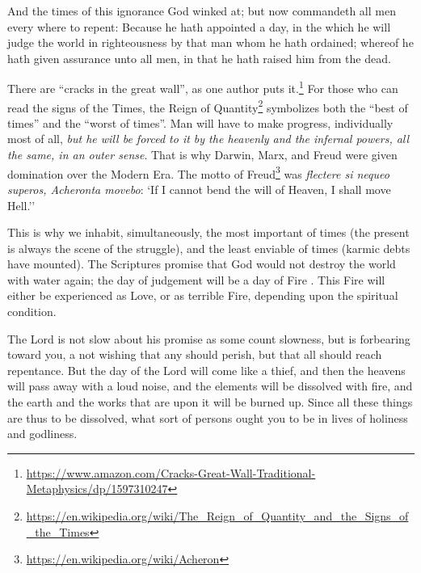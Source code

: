 \begin{quotex}
And the times of this ignorance God winked at; but now commandeth all men every where to repent: Because he hath appointed a day, in the which he will judge the world in righteousness by that man whom he hath ordained; whereof he hath given assurance unto all men, in that he hath raised him from the dead.
\end{quotex}


There are ``cracks in the great wall'', as one author puts it.\footnote{\url{https://www.amazon.com/Cracks-Great-Wall-Traditional-Metaphysics/dp/1597310247}} For those who can read the signs of the Times, the Reign of Quantity\footnote{\url{https://en.wikipedia.org/wiki/The\_Reign\_of\_Quantity\_and\_the\_Signs\_of\_the\_Times}} symbolizes both the ``best of times'' and the ``worst of times''. Man will have to make progress, individually most of all, \emph{but he will be forced to it by the heavenly and the infernal powers, all the same, in an outer sense}. That is why Darwin, Marx, and Freud were given domination over the Modern Era. The motto of Freud\footnote{\url{https://en.wikipedia.org/wiki/Acheron}} was \emph{flectere si nequeo superos, Acheronta movebo}: `If I cannot bend the will of Heaven, I shall move Hell.''

This is why we inhabit, simultaneously, the most important of times (the present is always the scene of the struggle), and the least enviable of times (karmic debts have mounted). The Scriptures promise that God would not destroy the world with water again; the day of judgement will be a day of Fire . This Fire will either be experienced as Love, or as terrible Fire, depending upon the spiritual condition.

\begin{quotex}
The Lord is not slow about his promise as some count slowness, but is forbearing toward you, a not wishing that any should perish, but that all should reach repentance. But the day of the Lord will come like a thief, and then the heavens will pass away with a loud noise, and the elements will be dissolved with fire, and the earth and the works that are upon it will be burned up. Since all these things are thus to be dissolved, what sort of persons ought you to be in lives of holiness and godliness.
\end{quotex}


